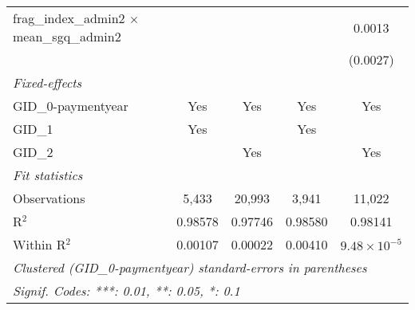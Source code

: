 \begin{tabular}{lcccc}
   frag\_index\_admin2 $\times$ mean\_sgq\_admin2      &               &          &                        & 0.0013\\   
                                                       &               &          &                        & (0.0027)\\   
   \midrule
   \emph{Fixed-effects}\\
   GID\_0-paymentyear                                  & Yes           & Yes      & Yes                    & Yes\\  
   GID\_1                                              & Yes           &          & Yes                    & \\  
   GID\_2                                              &               & Yes      &                        & Yes\\  
   \midrule
   \emph{Fit statistics}\\
   Observations                                        & 5,433         & 20,993   & 3,941                  & 11,022\\  
   R$^2$                                               & 0.98578       & 0.97746  & 0.98580                & 0.98141\\  
   Within R$^2$                                        & 0.00107       & 0.00022  & 0.00410                & $9.48\times 10^{-5}$\\   
   \midrule \midrule
   \multicolumn{5}{l}{\emph{Clustered (GID\_0-paymentyear) standard-errors in parentheses}}\\
   \multicolumn{5}{l}{\emph{Signif. Codes: ***: 0.01, **: 0.05, *: 0.1}}\\
\end{tabular}
\par\endgroup




